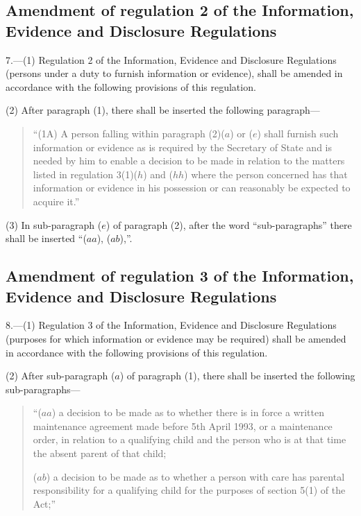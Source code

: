 \documentclass[12pt,a4paper]{article}
\begin{document}
\subsection[7. Amendment of regulation 2 of the Information, Evidence and Disclosure Regulations]{Amendment of regulation 2 of the Information, Evidence and Disclosure Regulations}

7.—(1) Regulation 2 of the Information, Evidence and Disclosure Regulations (persons under a duty to furnish information or evidence), shall be amended in accordance with the following provisions of this regulation.

(2) After paragraph (1), there shall be inserted the following paragraph—
\begin{quotation}
“(1A) A person falling within paragraph (2)($a$) or ($e$) shall furnish such information or evidence as is required by the Secretary of State and is needed by him to enable a decision to be made in relation to the matters listed in regulation 3(1)($h$) and ($hh$) where the person concerned has that information or evidence in his possession or can reasonably be expected to acquire it.”
\end{quotation}

(3) In sub-paragraph ($e$) of paragraph (2), after the word “sub-\hspace{0pt}paragraphs” there shall be inserted “($aa$), ($ab$),”.

\subsection[8. Amendment of regulation 3 of the Information, Evidence and Disclosure Regulations]{Amendment of regulation 3 of the Information, Evidence and Disclosure Regulations}

8.—(1) Regulation 3 of the Information, Evidence and Disclosure Regulations (purposes for which information or evidence may be required) shall be amended in accordance with the following provisions of this regulation.

(2) After sub-paragraph ($a$) of paragraph (1), there shall be inserted the following sub-paragraphs—
\begin{quotation}
“($aa$) a decision to be made as to whether there is in force a written maintenance agreement made before 5th April 1993, or a maintenance order, in relation to a qualifying child and the person who is at that time the absent parent of that child;

($ab$) a decision to be made as to whether a person with care has parental responsibility for a qualifying child for the purposes of section 5(1) of the Act;”
\end{quotation}
\end{document}
